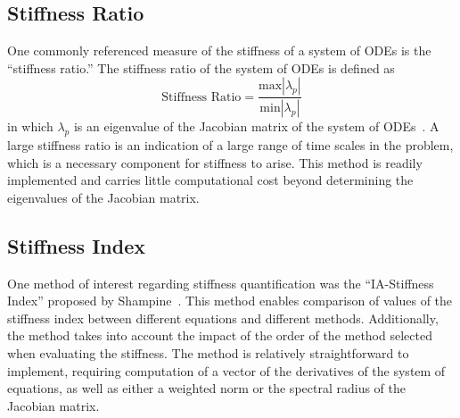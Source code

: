 \documentclass[12pt]{ussci}
\begin{document}
\subsection{Stiffness Ratio}
One commonly referenced measure of the stiffness of a system of ODEs is the ``stiffness ratio.''
The stiffness ratio of the system of ODEs is defined as
\begin{equation}
	\textrm{Stiffness Ratio} = \frac{\textrm{max}|\lambda_p|}{\textrm{min}|\lambda_p|}
\end{equation}
in which $\lambda_p$ is an eigenvalue of the Jacobian matrix of the system of ODEs~\cite{LeVeque2007}.
A large stiffness ratio is an indication of a large range of time scales in the problem, which is a necessary component for stiffness to arise.
This method is readily implemented and carries little computational cost beyond determining the eigenvalues of the Jacobian matrix.

\subsection{Stiffness Index}

One method of interest regarding stiffness quantification was the ``IA-Stiffness Index'' proposed by Shampine~\cite{Shampine1982}.
This method enables comparison of values of the stiffness index between different equations and different methods.
Additionally, the method takes into account the impact of the order of the method selected when evaluating the stiffness.
The method is relatively straightforward to implement, requiring computation of a vector of the derivatives of the system of equations, as well as either a weighted norm or the spectral radius of the Jacobian matrix.
\end{document}
